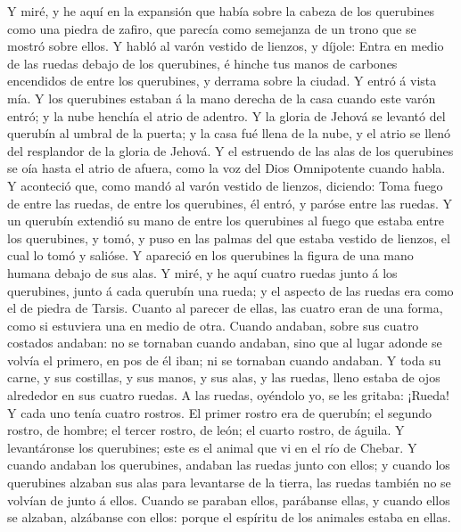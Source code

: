  Y miré, y he aquí en la expansión que había sobre la cabeza
de los querubines como una piedra de zafiro, que parecía como semejanza
de un trono que se mostró sobre ellos.  Y habló al varón
vestido de lienzos, y díjole: Entra en medio de las ruedas debajo de los
querubines, é hinche tus manos de carbones encendidos de entre los
querubines, y derrama sobre la ciudad. Y entró á vista mía. 
Y los querubines estaban á la mano derecha de la casa cuando este varón
entró; y la nube henchía el atrio de adentro.  Y la gloria
de Jehová se levantó del querubín al umbral de la puerta; y la casa fué
llena de la nube, y el atrio se llenó del resplandor de la gloria de
Jehová.  Y el estruendo de las alas de los querubines se oía
hasta el atrio de afuera, como la voz del Dios Omnipotente cuando habla.
 Y aconteció que, como mandó al varón vestido de lienzos,
diciendo: Toma fuego de entre las ruedas, de entre los querubines, él
entró, y paróse entre las ruedas.  Y un querubín extendió su
mano de entre los querubines al fuego que estaba entre los querubines, y
tomó, y puso en las palmas del que estaba vestido de lienzos, el cual lo
tomó y salióse.  Y apareció en los querubines la figura de
una mano humana debajo de sus alas.  Y miré, y he aquí
cuatro ruedas junto á los querubines, junto á cada querubín una rueda; y
el aspecto de las ruedas era como el de piedra de Tarsis. 
Cuanto al parecer de ellas, las cuatro eran de una forma, como si
estuviera una en medio de otra.  Cuando andaban, sobre sus
cuatro costados andaban: no se tornaban cuando andaban, sino que al
lugar adonde se volvía el primero, en pos de él iban; ni se tornaban
cuando andaban.  Y toda su carne, y sus costillas, y sus
manos, y sus alas, y las ruedas, lleno estaba de ojos alrededor en sus
cuatro ruedas.  A las ruedas, oyéndolo yo, se les gritaba:
¡Rueda!  Y cada uno tenía cuatro rostros. El primer rostro
era de querubín; el segundo rostro, de hombre; el tercer rostro, de
león; el cuarto rostro, de águila.  Y levantáronse los
querubines; este es el animal que vi en el río de Chebar. 
Y cuando andaban los querubines, andaban las ruedas junto con ellos; y
cuando los querubines alzaban sus alas para levantarse de la tierra, las
ruedas también no se volvían de junto á ellos.  Cuando se
paraban ellos, parábanse ellas, y cuando ellos se alzaban, alzábanse con
ellos: porque el espíritu de los animales estaba en ellas. 
